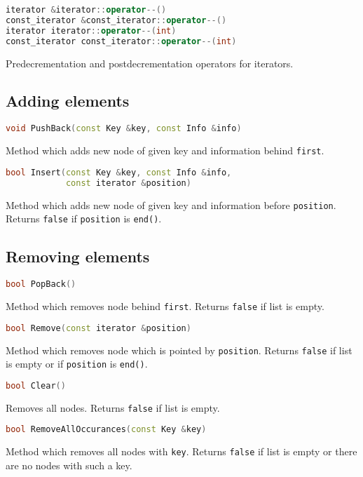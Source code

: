 \documentclass{article}
\begin{document}
\begin{lstlisting}[language=C++]
iterator &iterator::operator--()
const_iterator &const_iterator::operator--()
iterator iterator::operator--(int)
const_iterator const_iterator::operator--(int)
\end{lstlisting}
Predecrementation and postdecrementation operators for iterators.

\subsection{Adding elements}

\begin{lstlisting}[language=C++]
void PushBack(const Key &key, const Info &info)
\end{lstlisting}
Method which adds new node of given key and information behind {\tt first}.

\begin{lstlisting}[language=C++]
bool Insert(const Key &key, const Info &info, 
            const iterator &position)
\end{lstlisting}
Method which adds new node of given key and information before {\tt position}. Returns
{\tt false} if {\tt position} is {\tt end()}.
\vspace{\baselineskip}

\subsection{Removing elements}

\begin{lstlisting}[language=C++]
bool PopBack()
\end{lstlisting}
Method which removes node behind {\tt first}. Returns {\tt false} if list is empty.

\begin{lstlisting}[language=C++]
bool Remove(const iterator &position)
\end{lstlisting}
Method which removes node which is pointed by {\tt position}. Returns {\tt false} if list is empty
or if {\tt position} is {\tt end()}.

\begin{lstlisting}[language=C++]
bool Clear()
\end{lstlisting}
Removes all nodes. Returns {\tt false} if list is empty.

\begin{lstlisting}[language=C++]
bool RemoveAllOccurances(const Key &key)
\end{lstlisting}
Method which removes all nodes with {\tt key}. Returns {\tt false} if list is empty
or there are no nodes with such a key.
\vspace{\baselineskip}
\end{document}
